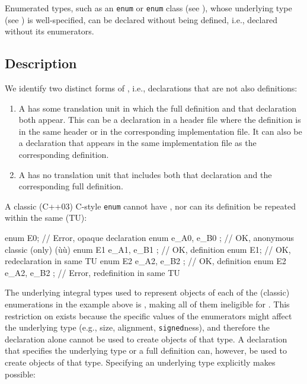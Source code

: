 \label{opaque-enumeration-declarations}

Enumerated types, such as an \lstinline!enum! or \lstinline!enum! class (see ), whose underlying type (see ) is well-specified, can be
declared without being defined, i.e., declared without its enumerators.

\subsection[Description]{Description}\label{description}

We identify two distinct forms of , i.e.,
declarations that are not also definitions:
\begin{enumerate}
\item{A  has some translation unit in which the full definition and that declaration both appear. This can be a declaration in a header file where the definition is in the same header or in the corresponding implementation file. It can also be a declaration that appears in the same implementation file as the corresponding definition.}
\item{A  has no translation unit that includes both that declaration and the corresponding full definition.}
\end{enumerate}

A classic (C++03) C-style \lstinline!enum! cannot have , nor can its definition be repeated within the same
 (TU):

\begin{emcppslisting}
enum E0;                 // Error, opaque declaration
enum    { e_A0, e_B0 };  // OK, anonymous classic (only) (ù{}ù)
enum E1 { e_A1, e_B1 };  // OK, definition
enum E1;                 // OK, redeclaration in same TU
enum E2 { e_A2, e_B2 };  // OK, definition
enum E2 { e_A2, e_B2 };  // Error, redefinition in same TU
\end{emcppslisting}

\noindent The underlying integral types used to represent objects of each of the
(classic) enumerations in the example above is , making
all of them ineligible for . This restriction
on  exists because the specific values of
the enumerators might affect the underlying type %
(e.g.,
size, alignment, \lstinline!signed!ness), and therefore the declaration
alone cannot be used to create objects of that type. A declaration that
specifies the underlying type or a full definition can, however, be used
to create objects of that type. Specifying an underlying
type %
explicitly makes  possible:

